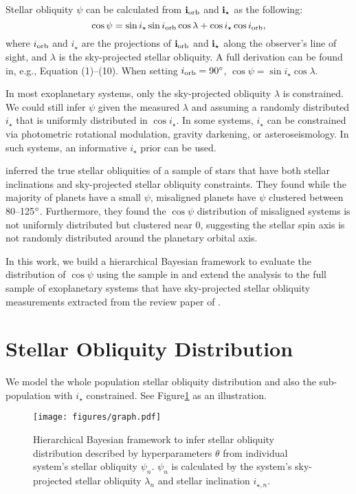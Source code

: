 \documentclass[twocolumn]{aastex631}
\begin{document}
Stellar obliquity $\psi$ can be calculated from $\bf{i}_{\rm orb}$ and $\bf{i}_{\star}$ as the following:
\begin{equation}
    \cos{\psi} = \sin{i_\star}\sin{i_{\rm orb}}\cos{\lambda} + \cos{i_\star}\cos{i_{\rm orb}},
\end{equation}
where $i_{\rm orb}$ and $i_\star$ are the projections of $\bf{i}_{\rm orb}$ and $\bf{i}_{\star}$ along the observer's line of sight, and $\lambda$ is the sky-projected stellar obliquity. A full derivation can be found in, e.g., \cite{Fabrycky09} Equation (1)--(10).
When setting $i_{\rm orb} = 90\mbox{$^\circ$}$, $\cos{\psi} = \sin{i_\star}\cos{\lambda}$.

In most exoplanetary systems, only the sky-projected obliquity $\lambda$ is constrained. We could still infer $\psi$ given the measured $\lambda$ and assuming a randomly distributed $i_\star$ that is uniformly distributed in $\cos{i_\star}$.
In some systems, $i_\star$ can be constrained via photometric rotational modulation, gravity darkening, or asteroseismology. In such systems, an informative $i_\star$ prior can be used.

\cite{Albrecht21} inferred the true stellar obliquities of a sample of stars that have both stellar inclinations and sky-projected stellar obliquity constraints. They found while the majority of planets have a small $\psi$, misaligned planets have $\psi$ clustered between 80--125$\mbox{$^\circ$}$. Furthermore, they found the $\cos{\psi}$ distribution of misaligned systems is not uniformly distributed but clustered near 0, suggesting the stellar spin axis is not randomly distributed around the planetary orbital axis.

In this work, we build a hierarchical Bayesian framework to evaluate the distribution of $\cos{\psi}$ using the sample in \cite{Albrecht21} and extend the analysis to the full sample of exoplanetary systems that have sky-projected stellar obliquity measurements extracted from the review paper of \cite{Albrecht22}.

\section{Stellar Obliquity Distribution} \label{sec:hbm}
We model the whole population stellar obliquity distribution and also the sub-population with $i_\star$ constrained. See Figure\ref{fig:graph} as an illustration. 

\begin{figure}[ht!]
    \texttt{[image: figures/graph.pdf]}
    \caption{Hierarchical Bayesian framework to infer stellar obliquity distribution described by hyperparameters $\theta$ from individual system's stellar obliquity $\psi_n$. $\psi_n$ is calculated by the system's sky-projected stellar obliquity $\lambda_n$ and stellar inclination $i_{\star, n}$.}
    \label{fig:graph}
\end{figure}
\end{document}
